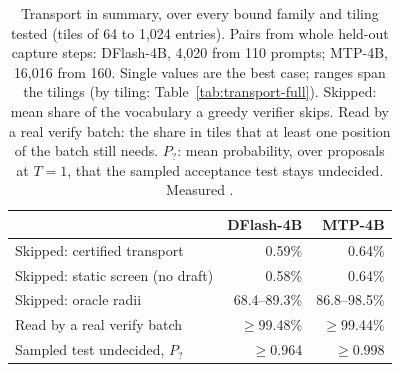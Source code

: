\begin{table}[htbp]
\caption{Transport in summary, over every bound family and tiling tested (tiles of 64 to 1,024 entries). Pairs from whole held-out capture steps: DFlash-4B, 4,020 from 110 prompts; MTP-4B, 16,016 from 160. Single values are the best case; ranges span the tilings (by tiling: Table~\ref{tab:transport-full}). Skipped: mean share of the vocabulary a greedy verifier skips. Read by a real verify batch: the share in tiles that at least one position of the batch still needs. $P_?$: mean probability, over proposals at $T=1$, that the sampled acceptance test stays undecided. Measured .}\label{tab:transport}
\vskip 0.05in
\centering\tablefont
\begin{tabular}{@{}lrr@{}}
\toprule
& DFlash-4B & MTP-4B\\\midrule
Skipped: certified transport & 0.59\% & 0.64\%\\
Skipped: static screen (no draft) & 0.58\% & 0.64\%\\
Skipped: oracle radii & 68.4--89.3\% & 86.8--98.5\%\\
Read by a real verify batch & $\ge$99.48\% & $\ge$99.44\%\\
Sampled test undecided, $P_?$ & $\ge$0.964 & $\ge$0.998\\
\bottomrule
\end{tabular}
\end{table}


